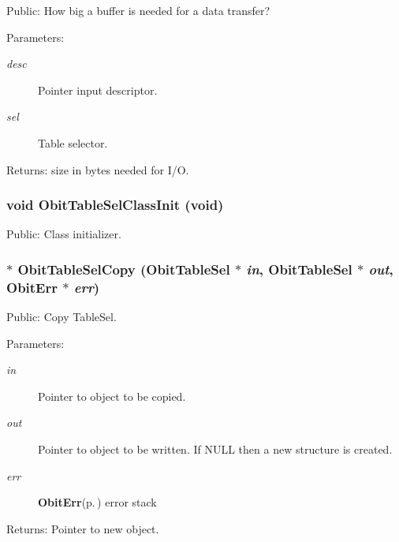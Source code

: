 Public: How big a buffer is needed for a data transfer? 

\begin{Desc}
\item[Parameters:]
\begin{description}
\item[{\em desc}]Pointer input descriptor. \item[{\em sel}]Table selector. \end{description}
\end{Desc}
\begin{Desc}
\item[Returns:]size in bytes needed for I/O. \end{Desc}
\subsubsection{\setlength{\rightskip}{0pt plus 5cm}void Obit\-Table\-Sel\-Class\-Init (void)}\label{ObitTableSel_8h_a3}


Public: Class initializer. 

\subsubsection{$\ast$ Obit\-Table\-Sel\-Copy ({\bf Obit\-Table\-Sel} $\ast$ {\em in}, {\bf Obit\-Table\-Sel} $\ast$ {\em out}, {\bf Obit\-Err} $\ast$ {\em err})}\label{ObitTableSel_8h_a6}


Public: Copy Table\-Sel. 

\begin{Desc}
\item[Parameters:]
\begin{description}
\item[{\em in}]Pointer to object to be copied. \item[{\em out}]Pointer to object to be written. If NULL then a new structure is created. \item[{\em err}]{\bf Obit\-Err}{\rm (p.\,\pageref{structObitErr})} error stack \end{description}
\end{Desc}
\begin{Desc}
\item[Returns:]Pointer to new object. \end{Desc}
